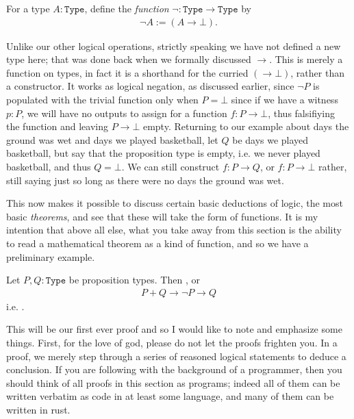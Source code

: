 \documentclass[11pt]{article}
\begin{document}
\begin{definition}
For a type $A\colon \mathtt{Type}$, define the \emph{function} $\neg \colon \mathtt{Type} \to \mathtt{Type}$ by \begin{gather*}
\neg A := (A \to \bot).
\end{gather*}
\end{definition}

Unlike our other logical operations, strictly speaking we have not defined a new type here; that was done back when we formally discussed $\to$. This is merely a function on types, in fact it is a shorthand for the curried $(\to \bot)$, rather than a constructor. It works as logical negation, as discussed earlier, since $\neg P$ is populated with the trivial function only when $P = \bot$ since if we have a witness $p \colon P$, we will have no outputs to assign for a function $f \colon P \to \bot$, thus falsifiying the function and leaving $P \to \bot$ empty. Returning to our example about days the ground was wet and days we played basketball, let $Q$ be days we played basketball, but say that the proposition type is empty, i.e. we never played basketball, and thus $Q = \bot$. We can still construct $f \colon P \to Q$, or $f \colon P \to \bot$ rather, still saying  just so long as there were no days the ground was wet.

This now makes it possible to discuss certain basic deductions of logic, the most basic \emph{theorems}, and see that these will take the form of functions. It is my intention that above all else, what you take away from this section is the ability to read a mathematical theorem as a kind of function, and so we have a preliminary example.

\begin{theorem}
Let $P,Q \colon \mathtt{Type}$ be proposition types. Then , or \begin{gather*}
P + Q \to \neg P \to Q
\end{gather*}
i.e. .
\end{theorem}

This will be our first ever proof and so I would like to note and emphasize some things. First, for the love of god, please do not let the proofs frighten you. In a proof, we merely step through a series of reasoned logical statements to deduce a conclusion. If you are following with the background of a programmer, then you should think of all proofs in this section as programs; indeed all of them can be written verbatim as code in at least some language, and many of them can be written in rust.
\end{document}
